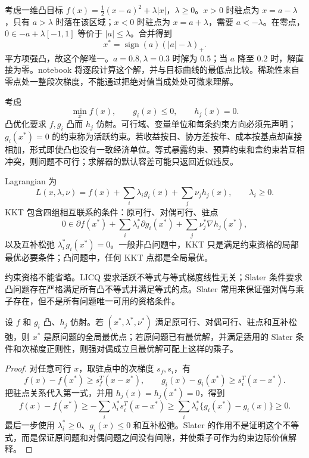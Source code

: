 
考虑一维凸目标 $f(x)=\tfrac12(x-a)^2+\lambda|x|$，$\lambda\geq0$。$x>0$ 时驻点为 $x=a-\lambda$，只有 $a>\lambda$ 时落在该区域；$x<0$ 时驻点为 $x=a+\lambda$，需要 $a<-\lambda$。在零点，$0\in-a+\lambda[-1,1]$ 等价于 $|a|\leq\lambda$。合并得到
\[
 x^*=\operatorname{sign}(a)(|a|-\lambda)_+.
\]
平方项强凸，故这个解唯一。$a=0.8,\lambda=0.3$ 时解为 $0.5$；当 $a$ 降至 $0.2$ 时，解直接为零。notebook 将逐段计算这个解，并与目标曲线的最低点比较。稀疏性来自零点处一整段次梯度，不能通过把绝对值当成处处可微来理解。


考虑
\[
\min_x f(x),\qquad g_i(x)\le0,\qquad h_j(x)=0.
\]
凸优化要求 $f,g_i$ 凸而 $h_j$ 仿射。可行域、变量单位和每条约束方向必须先声明；$g_i(x^*)=0$ 的约束称为活跃约束。若收益按日、协方差按年、成本按基点却直接相加，形式即使凸也没有一致经济单位。等式暴露约束、预算约束和盒约束若互相冲突，则问题不可行；求解器的默认容差可能只返回近似违反。

Lagrangian 为
\[
L(x,\lambda,\nu)=f(x)+\sum_i\lambda_i g_i(x)+\sum_j\nu_jh_j(x),
\qquad \lambda_i\ge0.
\]
KKT 包含四组相互联系的条件：原可行、对偶可行、驻点
\[
0\in\partial f(x^*)+\sum_i\lambda_i^*\partial g_i(x^*)
+\sum_j\nu_j^*\nabla h_j(x^*),
\]
以及互补松弛 $\lambda_i^*g_i(x^*)=0$。一般非凸问题中，KKT 只是满足约束资格的局部最优必要条件；凸问题中，任何 KKT 点都是全局最优。

约束资格不能省略。LICQ 要求活跃不等式与等式梯度线性无关；Slater 条件要求凸问题存在严格满足所有凸不等式并满足等式的点。Slater 常用来保证强对偶与乘子存在，但不是所有问题唯一可用的资格条件。

\begin{theorem}
设 $f$ 和 $g_i$ 凸、$h_j$ 仿射。若 $(x^*,\lambda^*,\nu^*)$ 满足原可行、对偶可行、驻点和互补松弛，则 $x^*$ 是原问题的全局最优点；若原问题已有最优解，并满足适用的 Slater 条件和次梯度正则性，则强对偶成立且最优解可配上这样的乘子。
\end{theorem}
\begin{proof}
对任意可行 $x$，取驻点中的次梯度 $s_f,s_i$，有
\[
 f(x)-f(x^*)\ge s_f^T(x-x^*),\qquad
 g_i(x)-g_i(x^*)\ge s_i^T(x-x^*).
\]
把驻点关系代入第一式，并用 $h_j(x)=h_j(x^*)=0$，得到
\[
 f(x)-f(x^*)\ge
 -\sum_i\lambda_i^*s_i^T(x-x^*)
 \ge\sum_i\lambda_i^*\{g_i(x^*)-g_i(x)\}\ge0.
\]
最后一步使用 $\lambda_i^*\ge0$、$g_i(x)\le0$ 和互补松弛。Slater 的作用不是证明这个不等式，而是保证原问题和对偶问题之间没有间隙，并使乘子可作为约束边际价值解释。
\end{proof}

